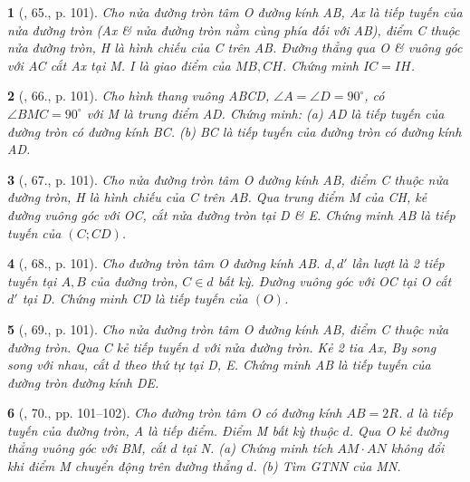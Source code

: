 \documentclass{article}
\newtheorem{baitoan}{}
\begin{document}
\begin{baitoan}[\cite{Binh_Toan_9_tap_1}, 65., p. 101]
	Cho nửa đường tròn tâm O đường kính AB, Ax là tiếp tuyến của nửa đường tròn (Ax \& nửa đường tròn nằm cùng phía đối với AB), điểm C thuộc nửa đường tròn, H là hình chiếu của C trên AB. Đường thẳng qua O \& vuông góc với AC cắt Ax tại M. I là giao điểm của $MB,CH$. Chứng minh $IC = IH$.
\end{baitoan}

\begin{baitoan}[\cite{Binh_Toan_9_tap_1}, 66., p. 101]
	Cho hình thang vuông ABCD, $\angle{A} = \angle{D} = 90^\circ$, có $\angle{BMC} = 90^\circ$ với M là trung điểm AD. Chứng minh: (a) AD là tiếp tuyến của đường tròn có đường kính BC. (b) BC là tiếp tuyến của đường tròn có đường kính AD.
\end{baitoan}

\begin{baitoan}[\cite{Binh_Toan_9_tap_1}, 67., p. 101]
	Cho nửa đường tròn tâm O đường kính AB, điểm C thuộc nửa đường tròn, H là hình chiếu của C trên AB. Qua trung điểm M của CH, kẻ đường vuông góc với OC, cắt nửa đường tròn tại D \& E. Chứng minh AB là tiếp tuyến của $(C;CD)$.
\end{baitoan}

\begin{baitoan}[\cite{Binh_Toan_9_tap_1}, 68., p. 101]
	Cho đường tròn tâm O đường kính AB. $d,d'$ lần lượt là 2 tiếp tuyến tại $A,B$ của đường tròn, $C\in d$ bất kỳ. Đường vuông góc với OC tại O cắt $d'$ tại D. Chứng minh CD là tiếp tuyến của $(O)$.
\end{baitoan}

\begin{baitoan}[\cite{Binh_Toan_9_tap_1}, 69., p. 101]
	Cho nửa đường tròn tâm O đường kính AB, điểm C thuộc nửa đường tròn. Qua C kẻ tiếp tuyến $d$ với nửa đường tròn. Kẻ 2 tia Ax, By song song với nhau, cắt $d$ theo thứ tự tại D, E. Chứng minh AB là tiếp tuyến của đường tròn đường kính DE.
\end{baitoan}

\begin{baitoan}[\cite{Binh_Toan_9_tap_1}, 70., pp. 101--102]
	Cho đường tròn tâm O có đường kính $AB = 2R$. $d$ là tiếp tuyến của đường tròn, A là tiếp điểm. Điểm M bất kỳ thuộc $d$. Qua O kẻ đường thẳng vuông góc với BM, cắt $d$ tại N. (a) Chứng minh tích $AM\cdot AN$ không đổi khi điểm M chuyển động trên đường thẳng $d$. (b) Tìm {\rm GTNN} của MN.
\end{baitoan}
\end{document}
